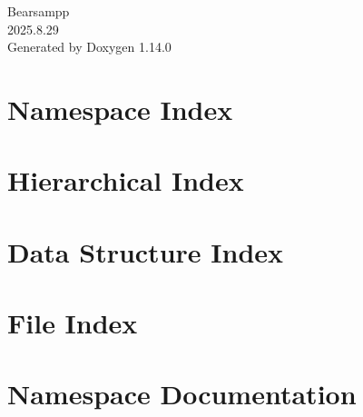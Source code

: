 \documentclass[twoside]{book}
\newcommand{\+}{\discretionary{\mbox{\scriptsize$\hookleftarrow$}}{}{}}
\newcommand{\clearemptydoublepage}{%
    \newpage{\pagestyle{empty}\cleardoublepage}%
  }
\begin{document}
  \raggedbottom
  \begin{titlepage}
  \vspace*{7cm}
  \begin{center}%
  {\Large Bearsampp}\\
  [1ex]\large 2025.\+8.\+29 \\
  \vspace*{1cm}
  {\large Generated by Doxygen 1.14.0}\\
  \end{center}
  \end{titlepage}
  \clearemptydoublepage
  \tableofcontents
  \clearemptydoublepage
\chapter{Namespace Index}

\chapter{Hierarchical Index}

\chapter{Data Structure Index}

\chapter{File Index}

\chapter{Namespace Documentation}

\end{document}
